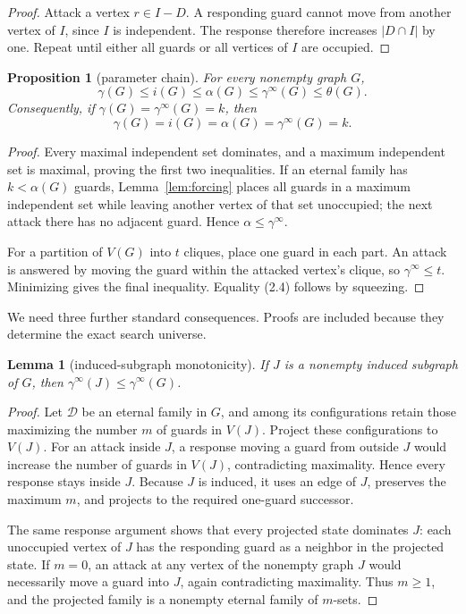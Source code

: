 \documentclass[11pt]{article}
\newtheorem{lemma}[theorem]{Lemma}
\newtheorem{proposition}[theorem]{Proposition}
\theoremstyle{definition}
\theoremstyle{remark}
\newcommand{\gaminf}{\gamma^{\infty}}
\newcommand{\V}{V}
\begin{document}
\begin{proof}
Attack a vertex \(r\in I-D\).  A responding guard cannot move from another
vertex of \(I\), since \(I\) is independent.  The response therefore
increases \(|D\cap I|\) by one.  Repeat until either all guards or all
vertices of \(I\) are occupied.
\end{proof}

\begin{proposition}[parameter chain]\label{prop:chain}
For every nonempty graph \(G\),
\[
  \gamma(G)\leq i(G)\leq\alpha(G)\leq\gaminf(G)\leq\theta(G).
\tag{2.3}
\]
Consequently, if \(\gamma(G)=\gaminf(G)=k\), then
\[
  \gamma(G)=i(G)=\alpha(G)=\gaminf(G)=k.
\tag{2.4}
\]
\end{proposition}

\begin{proof}
Every maximal independent set dominates, and a maximum independent set is
maximal, proving the first two inequalities.  If an eternal family has
\(k<\alpha(G)\) guards, Lemma~\ref{lem:forcing} places all guards in a
maximum independent set while leaving another vertex of that set
unoccupied; the next attack there has no adjacent guard.  Hence
\(\alpha\leq\gaminf\).

For a partition of \(\V(G)\) into \(t\) cliques, place one guard in each
part.  An attack is answered by moving the guard within the attacked
vertex's clique, so \(\gaminf\leq t\).  Minimizing gives the final
inequality.  Equality (2.4) follows by squeezing.
\end{proof}

We need three further standard consequences.  Proofs are included because
they determine the exact search universe.

\begin{lemma}[induced-subgraph monotonicity]\label{lem:induced}
If \(J\) is a nonempty induced subgraph of \(G\), then
\(\gaminf(J)\leq\gaminf(G)\).
\end{lemma}

\begin{proof}
Let \(\mathcal D\) be an eternal family in \(G\), and among its configurations
retain those maximizing the number \(m\) of guards in \(\V(J)\).  Project
these configurations to \(\V(J)\).  For an attack inside \(J\), a response
moving a guard from outside \(J\) would increase the number of guards in
\(\V(J)\), contradicting maximality.  Hence every response stays inside
\(J\).  Because \(J\) is induced, it uses an edge of \(J\), preserves the
maximum \(m\), and projects to the required one-guard successor.

The same response argument shows that every projected state dominates
\(J\): each unoccupied vertex of \(J\) has the responding guard as a
neighbor in the projected state.  If \(m=0\), an attack at any vertex of
the nonempty graph \(J\) would necessarily move a guard into \(J\), again
contradicting maximality.  Thus \(m\geq1\), and the projected family is a
nonempty eternal family of \(m\)-sets.
\end{proof}
\end{document}
